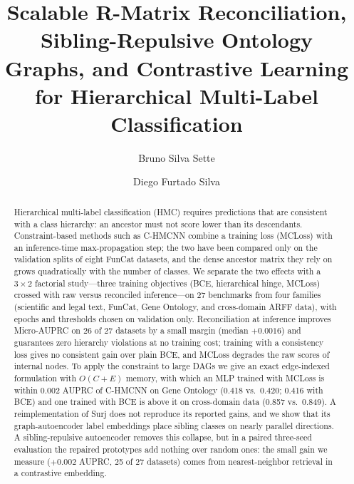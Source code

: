 \documentclass[preprint,12pt]{elsarticle}
\begin{document}
\begin{frontmatter}

\title{Scalable R-Matrix Reconciliation, Sibling-Repulsive Ontology Graphs,
and Contrastive Learning for Hierarchical Multi-Label Classification}

\author[ufscar]{Bruno Silva Sette}

\author[ufscar]{Diego Furtado Silva}



\begin{abstract}
Hierarchical multi-label classification (HMC) requires predictions that are
consistent with a class hierarchy: an ancestor must not score lower than its
descendants. Constraint-based methods such as C-HMCNN combine a training loss
(MCLoss) with an inference-time max-propagation step; the two have been
compared only on the validation splits of eight FunCat datasets, and the dense
ancestor matrix they rely on grows quadratically with the number of classes. We separate the two effects
with a $3 \times 2$ factorial study---three training objectives (BCE,
hierarchical hinge, MCLoss) crossed with raw versus reconciled inference---on
27 benchmarks from four families (scientific and legal text, FunCat, Gene
Ontology, and cross-domain ARFF data), with epochs and thresholds chosen on
validation only. Reconciliation at inference improves Micro-AUPRC on 26 of 27
datasets by a small margin (median $+0.0016$) and guarantees zero hierarchy
violations at no training cost; training with a consistency loss gives no
consistent gain over plain BCE, and MCLoss degrades the raw scores of internal
nodes. To apply the constraint to large DAGs we give an exact edge-indexed
formulation with $O(C{+}E)$ memory, with which an MLP trained with MCLoss is
within 0.002 AUPRC of C-HMCNN on Gene Ontology (0.418 vs.\ 0.420; 0.416 with
BCE) and one trained with BCE is above it on cross-domain data (0.857 vs.\
0.849). A reimplementation of Surj does not
reproduce its reported gains, and we show that its graph-autoencoder label
embeddings place sibling classes on nearly parallel directions. A
sibling-repulsive autoencoder removes this collapse, but in a paired three-seed
evaluation the repaired prototypes add nothing over random ones: the small gain
we measure ($+0.002$ AUPRC, 25 of 27 datasets) comes from nearest-neighbor
retrieval in a contrastive embedding.
\end{abstract}


\end{frontmatter}
\end{document}
